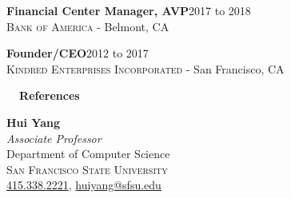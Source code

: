 \documentclass[hidelinks, 10.5pt]{article}
\newcommand{\contentwidth}{0.9\linewidth}
\newcommand{\contentspacing}{2.5mm}
\newcommand{\sectionspacing}{8mm}
\newcommand{\sectiontocontentspacing}{4mm}
\begin{document}
{\vspace{\sectiontocontentspacing}

\begin{minipage}[ct]{\contentwidth}
    \textbf{Financial Center Manager, AVP}\hfill 2017 to 2018\\
    {\textsc{Bank of America} - Belmont, CA}
\end{minipage}

\vspace{\contentspacing}

\begin{minipage}[ct]{\contentwidth}
    \textbf{Founder/CEO}\hfill 2012 to 2017\\
    {\textsc{Kindred Enterprises Incorporated} - San Francisco, CA}
\end{minipage}





\vspace{\sectionspacing}


{\fontsize{14}{14}\selectfont \textbf{\ \ References\ \ }}\hrulefill

\vspace{\sectiontocontentspacing}

\begin{minipage}[ct]{\contentwidth}
    \begin{multicols}{2}
        \textbf{Hui Yang}\\
        \emph{Associate Professor}\\
        {Department of Computer Science}\\
        \textsc{San Francisco State University}\\
        \href{tel:4153382221}{415.338.2221}, \href{mailto:huiyang@sfsu.edu}{huiyang@sfsu.edu}\\


\end{multicols}
\end{minipage}}
\end{document}
